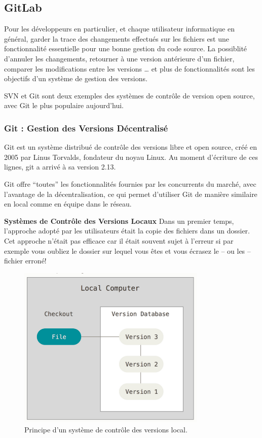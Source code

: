 \documentclass[a4paper,11pt,oneside]{report}
\begin{document}
\subsection{GitLab}
Pour les développeurs en particulier, et chaque utilisateur informatique en général, garder la trace des changements effectués sur les fichiers est une fonctionnalité essentielle pour une bonne gestion du code source. La possiblité d’annuler les changements, retourner à une version antérieure d’un fichier, comparer les modifications entre les versions … et plus de fonctionnalités sont les objectifs d’un système de gestion des versions. 
\newline

SVN et Git sont deux exemples des systèmes de contrôle de version open source, avec Git le plus populaire aujourd'hui.

\subsubsection{Git : Gestion des Versions Décentralisé}
Git est un système distribué de contrôle des versions libre et open source, créé en 2005 par Linus Torvalds, fondateur du noyau Linux. Au moment d’écriture de ces lignes, git a arrivé à sa version 2.13. 
\newline

Git offre “toutes” les fonctionnalités fournies par les concurrents du marché, avec l’avantage de la décentralisation, ce qui permet d’utiliser Git de manière similaire en local comme en équipe dans le réseau.
\newline

\textbf{Systèmes de Contrôle des Versions Locaux} \newline
Dans un premier temps, l’approche adopté par les utilisateurs était la copie des fichiers dans un dossier. Cet approche n’était pas efficace car il était souvent sujet à l’erreur si par exemple vous oubliez le dossier sur lequel vous êtes et vous écrasez le – ou les – fichier erroné!


\begin{figure}[H]
    \centering
    \includegraphics[width=9cm]{local-scm.png}
    \caption{Principe d'un système de contrôle des versions local.}
    \label{fig:local-scm}
\end{figure}
\end{document}
